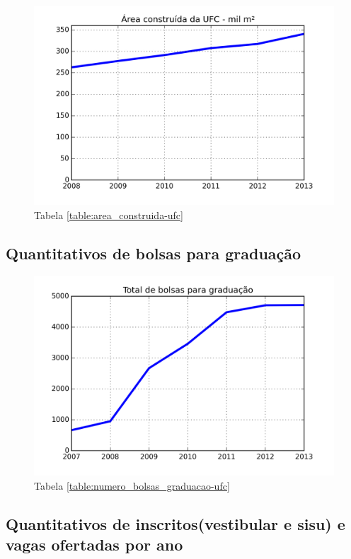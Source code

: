 \documentclass{report}
\begin{document}
\begin{figure}[H]
	\includegraphics{img/area_construida_ufc.png}
	\caption{Tabela \ref{table:area_construida-ufc}}
	\label{img:area_construida-ufc}
\end{figure}


\subsection{Quantitativos de bolsas para graduação}

\begin{figure}[H]
	\includegraphics{img/numero_bolsas_graduacao_ufc.png}
	\caption{Tabela \ref{table:numero_bolsas_graduacao-ufc}}
	\label{img:numero_bolsas_graduacao-ufc}
\end{figure}

\subsection{Quantitativos de inscritos(vestibular e sisu) e vagas ofertadas por ano}
\end{document}
